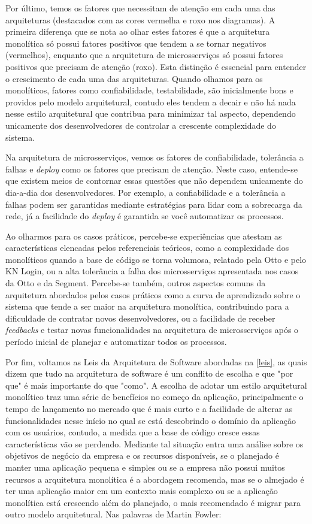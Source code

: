 Por último, temos os fatores que necessitam de atenção em cada uma das arquiteturas (destacados com as
cores vermelha e roxo nos diagramas). A primeira diferença que se nota ao olhar estes fatores é que
a arquitetura monolítica só possui fatores positivos que tendem a se tornar negativos (vermelhos),
enquanto que a arquitetura de microsserviços só possui fatores positivos que precisam de atenção
(roxo). Esta distinção é essencial para entender o crescimento de cada uma das arquiteturas. Quando
olhamos para os monolíticos, fatores como confiabilidade, testabilidade, são inicialmente bons e
providos pelo modelo arquitetural, contudo eles tendem a decair e não há nada nesse estilo arquitetural
que contribua para minimizar tal aspecto, dependendo unicamente dos desenvolvedores de controlar a
crescente complexidade do sistema.

Na arquitetura de microsserviços, vemos os fatores de confiabilidade, tolerância a falhas e \textit{deploy}
como os fatores que precisam de atenção. Neste caso, entende-se que existem meios de contornar essas
questões que não dependem unicamente do dia-a-dia dos desenvolvedores. Por exemplo, a confiabilidade
e a tolerância a falhas podem ser garantidas mediante estratégias para lidar com a sobrecarga da
rede, já a facilidade do \textit{deploy} é garantida se você automatizar os processos.

Ao olharmos para os casos práticos, percebe-se experiências que atestam as características elencadas
pelos referenciais teóricos, como a complexidade dos monolíticos quando a base de código se torna
volumosa, relatado pela Otto e pelo KN Login, ou a alta tolerância a falha dos microsserviços
apresentada nos casos da Otto e da Segment. Percebe-se também, outros aspectos comuns da arquitetura
abordados pelos casos práticos como a curva de aprendizado sobre o sistema que tende a ser maior na
arquitetura monolítica, contribuindo para a dificuldade de contratar novos desenvolvedores, ou a
facilidade de receber \textit{feedbacks} e testar novas funcionalidades na arquitetura de
microsserviços após o período inicial de planejar e automatizar todos os processos.

Por fim, voltamos as Leis da Arquitetura de Software abordadas na \autoref{leis}, as quais dizem que
tudo na arquitetura de software é um conflito de escolha e que "por que" é mais importante do que
"como". A escolha de adotar um estilo arquitetural monolítico traz uma série de benefícios no começo
da aplicação, principalmente o tempo de lançamento no mercado que é mais curto e a facilidade de
alterar as funcionalidades nesse início no qual se está descobrindo o domínio da aplicação com os
usuários, contudo, a medida que a base de código cresce essas características vão se perdendo.
Mediante tal situação entra uma análise sobre os objetivos de negócio da empresa e os recursos
disponíveis, se o planejado é manter uma aplicação pequena e simples ou se a empresa não possui muitos
recursos a arquitetura monolítica é a abordagem recomenda, mas se o almejado é ter uma aplicação maior
em um contexto mais complexo ou se a aplicação monolítica está crescendo além do planejado, o mais
recomendado é migrar para outro modelo arquitetural. Nas palavras de Martin Fowler:

